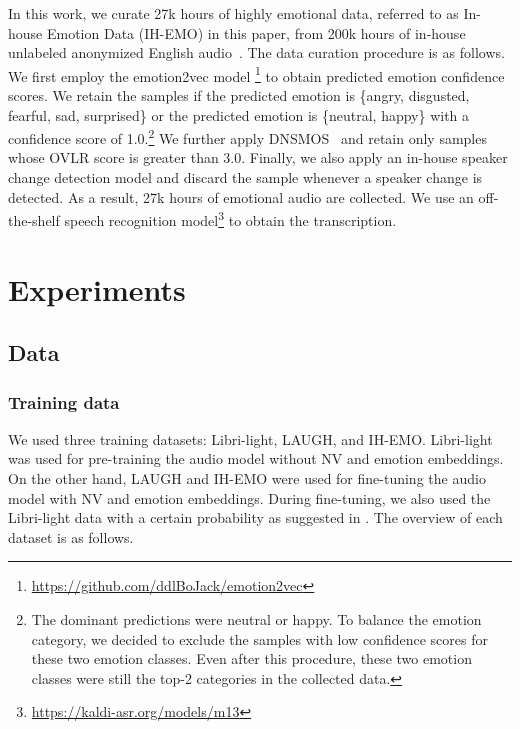 In this work, we curate 27k hours of highly emotional data, referred to as In-house Emotion Data (IH-EMO) in this paper, from 200k hours of in-house unlabeled anonymized English audio~\cite{wang2024investigation}. The data curation procedure is as follows. We first employ the emotion2vec model \cite{ma2023emotion2vec}\footnote{\label{fn:emo2vec}\url{https://github.com/ddlBoJack/emotion2vec}} to obtain predicted emotion confidence scores. We retain the samples if the predicted emotion is \{angry, disgusted, fearful, sad, surprised\} or the predicted emotion is \{neutral, happy\} with a confidence score of 1.0.\footnote{The dominant predictions were neutral or happy. To balance the emotion category, we decided to exclude the samples with low confidence scores for these two emotion classes. Even after this procedure, these two emotion classes were still the top-2 categories in the collected data.} We further apply DNSMOS~\cite{reddy2022dnsmos} and retain only samples whose OVLR score is greater than 3.0. Finally, we also apply an in-house speaker change detection model and discard the sample whenever a speaker change is detected. As a result, 27k hours of emotional audio are collected.
We use an off-the-shelf speech recognition model\footnote{\label{fn:kaldi}\url{https://kaldi-asr.org/models/m13}} to obtain the transcription.

\vspace{-.5em}
\section{Experiments}
\vspace{-.5em}
\label{sec:experiments}

\vspace{-.5em}
\subsection{Data}

\vspace{-.5em}
\subsubsection{Training data}

\vspace{-.5em}

We used three training datasets: Libri-light, LAUGH, and IH-EMO. Libri-light was used for pre-training the audio model without NV and emotion embeddings. On the other hand, LAUGH and IH-EMO were used for fine-tuning the audio model with NV and emotion embeddings. During fine-tuning, we also used the Libri-light data with a certain probability as suggested in \cite{kanda2024making}. The overview of each dataset is as follows.

